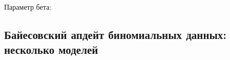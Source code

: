 \documentclass[
]{book}
\makeatletter
\newenvironment{kframe}{%
    \medskip{}
    \setlength{\fboxsep}{.8em}
    \def\at@end@of@kframe{}%
    \ifinner\ifhmode%
    \def\at@end@of@kframe{\end{minipage}}%
    \begin{minipage}{\columnwidth}%
    \fi\fi%
    \def\FrameCommand##1{\hskip\@totalleftmargin \hskip-\fboxsep
    \colorbox{shadecolor}{##1}\hskip-\fboxsep
        \hskip-\linewidth \hskip-\@totalleftmargin \hskip\columnwidth}%
    \MakeFramed {\advance\hsize-\width
      \@totalleftmargin\z@ \linewidth\hsize
      \@setminipage}}%
  {\par\unskip\endMakeFramed%
    \at@end@of@kframe}
\newenvironment{rmdblock}[1]
  {
    \begin{itemize}
    \renewcommand{\labelitemi}{
      \raisebox{-.7\height}[0pt][0pt]{
        {\setkeys{Gin}{width=3em,keepaspectratio}\texttt{[image: images/\#1]}}
        }
        }
        \setlength{\fboxsep}{1em}
        \begin{kframe}
        \item
      }
      {
        \end{kframe}
        \end{itemize}
      }
\newenvironment{rmdtask}
      {\begin{rmdblock}{task}}
      {\end{rmdblock}}
\makeatother
\begin{document}
\begin{rmdtask}
Параметр бета:
\end{rmdtask}

\hypertarget{ux431ux430ux439ux435ux441ux43eux432ux441ux43aux438ux439-ux430ux43fux434ux435ux439ux442-ux431ux438ux43dux43eux43cux438ux430ux43bux44cux43dux44bux445-ux434ux430ux43dux43dux44bux445-ux43dux435ux441ux43aux43eux43bux44cux43aux43e-ux43cux43eux434ux435ux43bux435ux439}{%
\subsection{Байесовский апдейт биномиальных данных: несколько моделей}\label{ux431ux430ux439ux435ux441ux43eux432ux441ux43aux438ux439-ux430ux43fux434ux435ux439ux442-ux431ux438ux43dux43eux43cux438ux430ux43bux44cux43dux44bux445-ux434ux430ux43dux43dux44bux445-ux43dux435ux441ux43aux43eux43bux44cux43aux43e-ux43cux43eux434ux435ux43bux435ux439}}
\end{document}
